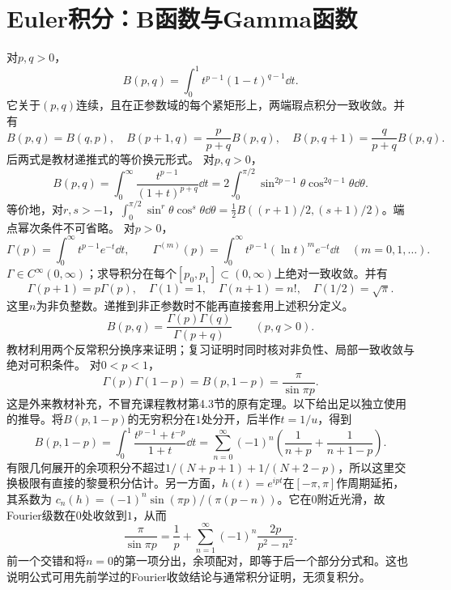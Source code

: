 \section{Euler积分：B函数与Gamma函数}
对$p,q>0$，
\[
 B(p,q)=\int_0^1 t^{p-1}(1-t)^{q-1}\dd t.
\]
它关于$(p,q)$连续，且在正参数域的每个紧矩形上，两端瑕点积分一致收敛。并有
\[
 B(p,q)=B(q,p),\quad
 B(p+1,q)=\frac{p}{p+q}B(p,q),\quad
 B(p,q+1)=\frac{q}{p+q}B(p,q).
\]
后两式是教材递推式的等价换元形式。
对$p,q>0$，
\[
 B(p,q)=\int_0^\infty\frac{t^{p-1}}{(1+t)^{p+q}}\dd t
 =2\int_0^{\pi/2}\sin^{2p-1}\theta\cos^{2q-1}\theta\dd\theta.
\]
等价地，对$r,s>-1$，$\int_0^{\pi/2}\sin^r\theta\cos^s\theta\dd\theta
=\tfrac12 B((r+1)/2,(s+1)/2)$。端点幂次条件不可省略。
对$p>0$，
\[
 \Gamma(p)=\int_0^\infty t^{p-1}e^{-t}\dd t,
 \qquad
 \Gamma^{(m)}(p)=\int_0^\infty t^{p-1}(\ln t)^m e^{-t}\dd t
 \quad(m=0,1,\ldots).
\]
$\Gamma\in C^\infty(0,\infty)$；求导积分在每个$[p_0,p_1]\subset(0,\infty)$上绝对一致收敛。并有
\[
 \Gamma(p+1)=p\Gamma(p),\quad \Gamma(1)=1,\quad
 \Gamma(n+1)=n!,\quad \Gamma(1/2)=\sqrt\pi.
\]
这里$n$为非负整数。递推到非正参数时不能再直接套用上述积分定义。
\[
 B(p,q)=\frac{\Gamma(p)\Gamma(q)}{\Gamma(p+q)}\qquad(p,q>0).
\]
教材利用两个反常积分换序来证明；复习证明时同时核对非负性、局部一致收敛与绝对可积条件。
对$0<p<1$，
\[
 \Gamma(p)\Gamma(1-p)=B(p,1-p)=\frac\pi{\sin\pi p}.
\]
这是外来教材补充，不冒充课程教材第4.3节的原有定理。以下给出足以独立使用的推导。将$B(p,1-p)$的无穷积分在$1$处分开，后半作$t=1/u$，得到
\[
 B(p,1-p)=\int_0^1\frac{t^{p-1}+t^{-p}}{1+t}\dd t
 =\sum_{n=0}^\infty(-1)^n\left(\frac1{n+p}+\frac1{n+1-p}\right).
\]
有限几何展开的余项积分不超过$1/(N+p+1)+1/(N+2-p)$，所以这里交换极限有直接的黎曼积分估计。另一方面，$h(t)=e^{ipt}$在$[-\pi,\pi]$作周期延拓，其系数为
$c_n(h)=(-1)^n\sin(\pi p)/(\pi(p-n))$。它在$0$附近光滑，故Fourier级数在$0$处收敛到$1$，从而
\[
 \frac\pi{\sin\pi p}=\frac1p+\sum_{n=1}^\infty(-1)^n\frac{2p}{p^2-n^2}.
\]
前一个交错和将$n=0$的第一项分出，余项配对，即等于后一个部分分式和。这也说明公式可用先前学过的Fourier收敛结论与通常积分证明，无须复积分。
